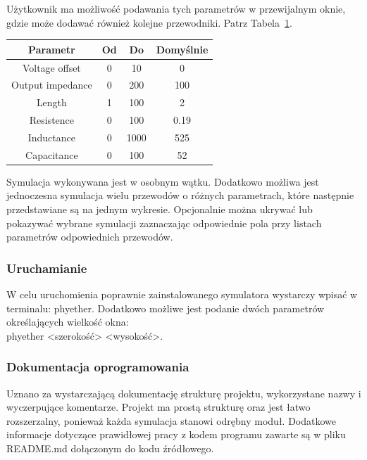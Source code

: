 Użytkownik ma możliwość podawania tych parametrów w przewijalnym oknie, gdzie może dodawać również kolejne przewodniki. Patrz Tabela~\ref{tab:parametry}.

\begin{table}[H]
    \centering
    \begin{tabular}{|c|c|c|c|}
        \hline
        \textbf{Parametr} & \textbf{Od} & \textbf{Do} & \textbf{Domyślnie} \\
        \hline
        Voltage offset & 0 & 10 & 0 \\
        Output impedance & 0 & 200 & 100 \\
        Length & 1 & 100 & 2 \\
        Resistence & 0 & 100 & 0.19 \\
        Inductance & 0 & 1000 & 525 \\
        Capacitance & 0 & 100 & 52 \\
        \hline
    \end{tabular}
    \label{tab:parametry}
\end{table}

Symulacja wykonywana jest w osobnym wątku. Dodatkowo możliwa jest jednoczesna symulacja wielu przewodów o różnych parametrach, które następnie przedstawiane są na jednym wykresie. Opcjonalnie można ukrywać lub pokazywać wybrane symulacji zaznaczając odpowiednie pola przy listach parametrów odpowiednich przewodów.

\subsubsection{Uruchamianie}
W celu uruchomienia poprawnie zainstalowanego symulatora wystarczy wpisać w terminalu: phyether. Dodatkowo możliwe jest podanie dwóch parametrów określających wielkość okna: \\ phyether <szerokość> <wysokość>.

\subsubsection{Dokumentacja oprogramowania}
Uznano za wystarczającą dokumentację strukturę projektu, wykorzystane nazwy i wyczerpujące komentarze. Projekt ma prostą strukturę oraz jest łatwo rozszerzalny, ponieważ każda symulacja stanowi odrębny moduł. Dodatkowe informacje dotyczące prawidłowej pracy z kodem programu zawarte są w pliku README.md dołączonym do kodu źródłowego.